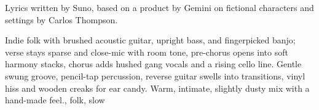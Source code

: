 

\begin{notes}
Lyrics written by Suno, based on a product by Gemini on fictional characters and settings by Carlos Thompson.
\end{notes}

\begin{style}
Indie folk with brushed acoustic guitar, upright bass, and fingerpicked banjo; verse stays sparse and close-mic with room tone, pre-chorus opens into soft harmony stacks, chorus adds hushed gang vocals and a rising cello line. %
Gentle swung groove, pencil-tap percussion, reverse guitar swells into transitions, vinyl hiss and wooden creaks for ear candy. %
Warm, intimate, slightly dusty mix with a hand-made feel., folk, slow
\end{style}

